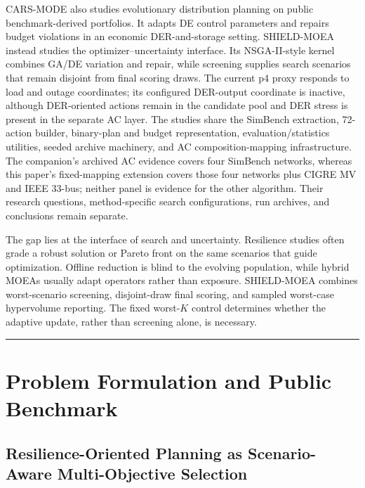 \documentclass[energies,article,submit,moreauthors]{Definitions/mdpi}
\begin{document}
CARS-MODE \cite{ref42} also studies evolutionary distribution planning on public benchmark-derived portfolios. It adapts DE control parameters and repairs budget violations in an economic DER-and-storage setting. SHIELD-MOEA instead studies the optimizer--uncertainty interface. Its NSGA-II-style kernel combines GA/DE variation and repair, while screening supplies search scenarios that remain disjoint from final scoring draws. The current p4 proxy responds to load and outage coordinates; its configured DER-output coordinate is inactive, although DER-oriented actions remain in the candidate pool and DER stress is present in the separate AC layer. The studies share the SimBench extraction, 72-action builder, binary-plan and budget representation, evaluation/statistics utilities, seeded archive machinery, and AC composition-mapping infrastructure. The companion's archived AC evidence covers four SimBench networks, whereas this paper's fixed-mapping extension covers those four networks plus CIGRE MV and IEEE 33-bus; neither panel is evidence for the other algorithm. Their research questions, method-specific search configurations, run archives, and conclusions remain separate.

The gap lies at the interface of search and uncertainty. Resilience studies often grade a robust solution or Pareto front on the same scenarios that guide optimization. Offline reduction is blind to the evolving population, while hybrid MOEAs usually adapt operators rather than exposure. SHIELD-MOEA combines worst-scenario screening, disjoint-draw final scoring, and sampled worst-case hypervolume reporting. The fixed worst-\(K\) control determines whether the adaptive update, rather than screening alone, is necessary.

\begin{center}\rule{0.5\linewidth}{0.5pt}\end{center}

\section{Problem Formulation and Public Benchmark}\label{problem-formulation-and-public-benchmark}

\subsection{Resilience-Oriented Planning as Scenario-Aware Multi-Objective Selection}\label{resilience-oriented-planning-as-scenario-aware-multi-objective-selection}
\end{document}
